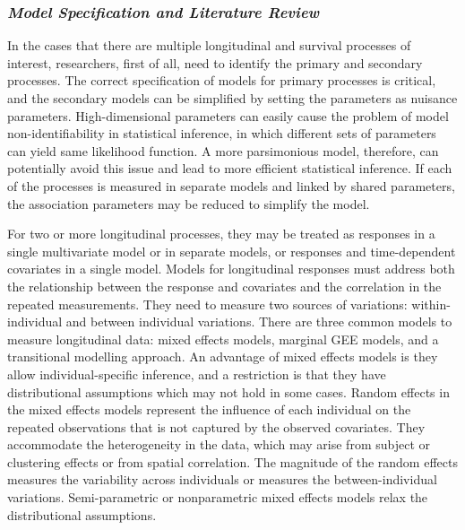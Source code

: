 \subsubsection*{\textit{Model Specification and Literature Review}}

In the cases that there are multiple longitudinal and survival processes of interest, researchers, first of all, need to identify the primary and secondary processes. The correct specification of models for primary processes is critical, and the secondary models can be simplified by setting the parameters as nuisance parameters. High-dimensional parameters can easily cause the problem of model non-identifiability in statistical inference, in which different sets of parameters can yield same likelihood function. A more parsimonious model, therefore, can potentially avoid this issue and lead to more efficient statistical inference. 
If each of the processes is measured in separate models and linked by shared parameters, the association parameters may be reduced to simplify the model.

For two or more longitudinal processes, they may be treated as responses in a single multivariate model or in separate models, or responses and time-dependent covariates in a single model. Models for longitudinal responses must address both the relationship between the response and covariates and the correlation in the repeated measurements. They need to measure two sources of variations: within-individual and between individual variations. There are three common models to measure longitudinal data: mixed effects models, marginal GEE models, and a transitional modelling approach. An advantage of mixed effects models is they allow individual-specific inference, and a restriction is that they have distributional assumptions which may not hold in some cases. Random effects in the mixed effects models represent the influence of each individual on the repeated observations that is not captured by the observed covariates. They accommodate the heterogeneity in the data, which may arise from subject or clustering effects or from spatial correlation. The magnitude of the random effects measures the variability across individuals or measures the between-individual variations. Semi-parametric or nonparametric mixed effects models relax the distributional assumptions.


